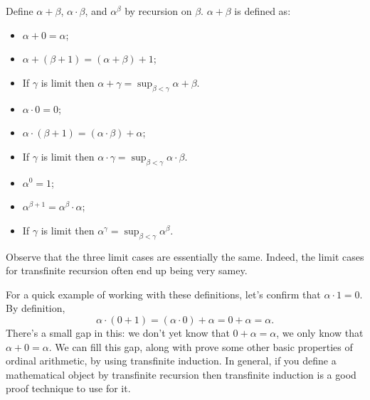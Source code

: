 \documentclass[10pt]{amsart}
\begin{document}
\begin{definition}
Define $\alpha + \beta$, $\alpha \cdot \beta$, and $\alpha^\beta$ by recursion on $\beta$. $\alpha + \beta$ is defined as:
\begin{itemize}
\item $\alpha + 0 = \alpha$;
\item $\alpha + (\beta + 1) = (\alpha + \beta) + 1$;
\item If $\gamma$ is limit then $\alpha + \gamma = \sup_{\beta < \gamma} \alpha + \beta$.
\end{itemize}
\begin{itemize}
\item $\alpha \cdot 0 = 0$;
\item $\alpha \cdot (\beta + 1) = (\alpha \cdot \beta) + \alpha$;
\item If $\gamma$ is limit then $\alpha \cdot \gamma = \sup_{\beta < \gamma} \alpha \cdot \beta$.
\end{itemize}
\begin{itemize}
\item $\alpha^0 = 1$;
\item $\alpha^{\beta + 1} = \alpha^\beta \cdot \alpha$;
\item If $\gamma$ is limit then $\alpha^\gamma = \sup_{\beta < \gamma} \alpha^\beta$.
\end{itemize}
\end{definition}

Observe that the three limit cases are essentially the same. Indeed, the limit cases for transfinite recursion often end up being very samey. 

For a quick example of working with these definitions, let's confirm that $\alpha \cdot 1 = 0$. By definition,
\[
\alpha \cdot (0+1) = (\alpha \cdot 0) + \alpha = 0 + \alpha = \alpha.
\]
There's a small gap in this: we don't yet know that $0 + \alpha = \alpha$, we only know that $\alpha + 0 = \alpha$. We can fill this gap, along with prove some other basic properties of ordinal arithmetic, by using transfinite induction. In general, if you define a mathematical object by transfinite recursion then transfinite induction is a good proof technique to use for it.
\end{document}
